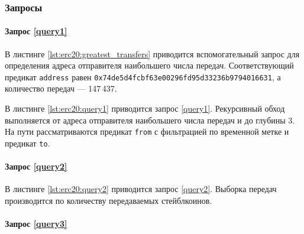 \subsubsection{Запросы}

\paragraph{Запрос \ref{query1}}

В листинге \ref{lst:erc20:greatest_transfers} приводится вспомогательный запрос для определения адреса отправителя
наибольшего числа передач. Соответствующий предикат \texttt{address} равен
\texttt{0x74de5d4fcbf63e00296fd95d33236b9794016631}, а количество передач --- 147\,437.

В листинге \ref{lst:erc20:query1} приводится запрос \ref{query1}. Рекурсивный обход выполняется от адреса отправителя
наибольшего числа передач и до глубины 3. На пути рассматриваются предикат \texttt{from} с фильтрацией по временной
метке и предикат \texttt{to}.

\paragraph{Запрос \ref{query2}}

В листинге \ref{lst:erc20:query2} приводится запрос \ref{query2}. Выборка передач производится по количеству передаваемых
стейблкоинов.

\paragraph{Запрос \ref{query3}}

